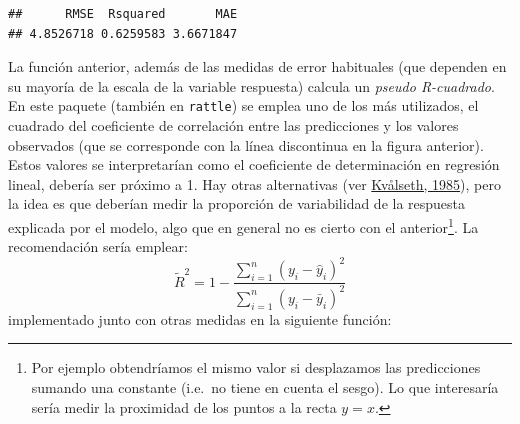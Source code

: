 \documentclass[
  spanish,
]{book}
\theoremstyle{break}
\theoremstyle{definition}
\theoremstyle{definition}
\theoremstyle{definition}
\theoremstyle{definition}
\theoremstyle{remark}
\begin{document}
\begin{verbatim}
##      RMSE  Rsquared       MAE 
## 4.8526718 0.6259583 3.6671847
\end{verbatim}

La función anterior, además de las medidas de error habituales (que dependen en su mayoría de la escala de la variable respuesta) calcula un \emph{pseudo R-cuadrado}.
En este paquete (también en \texttt{rattle}) se emplea uno de los más utilizados, el cuadrado del coeficiente de correlación entre las predicciones y los valores observados (que se corresponde con la línea discontinua en la figura anterior).
Estos valores se interpretarían como el coeficiente de determinación en regresión lineal, debería ser próximo a 1.
Hay otras alternativas (ver \protect\hyperlink{ref-kvaalseth1985cautionary}{Kvålseth, 1985}), pero la idea es que deberían medir la proporción de variabilidad de la respuesta explicada por el modelo, algo que en general no es cierto con el anterior\footnote{Por ejemplo obtendríamos el mismo valor si desplazamos las predicciones sumando una constante (i.e.~no tiene en cuenta el sesgo). Lo que interesaría sería medir la proximidad de los puntos a la recta \(y=x\).}.
La recomendación sería emplear:
\[\tilde R^2 = 1 - \frac{\sum_{i=1}^n(y_i - \hat y_i)^2}{\sum_{i=1}^n(y_i - \bar y_i)^2}\]
implementado junto con otras medidas en la siguiente función:
\end{document}
